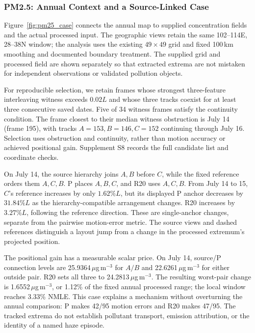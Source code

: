 \subsubsection{PM2.5: Annual Context and a Source-Linked Case}\label{sec:pm25_case}

Figure~\ref{fig:pm25_case} connects the annual map to supplied concentration fields and the actual processed input. The geographic views retain the same 102--114\textdegree E, 28--38\textdegree N window; the analysis uses the existing $49\times49$ grid and fixed 100\,km smoothing and documented boundary treatment. The supplied grid and processed field are shown separately so that extracted extrema are not mistaken for independent observations or validated pollution objects.

For reproducible selection, we retain frames whose strongest three-feature interleaving witness exceeds $0.02L$ and whose three tracks coexist for at least three consecutive saved dates. Five of 34 witness frames satisfy the continuity condition. The frame closest to their median witness obstruction is July 14 (frame 195), with tracks $A=153,B=146,C=152$ continuing through July 16. Selection uses obstruction and continuity, rather than motion accuracy or achieved positional gain. Supplement S8 records the full candidate list and coordinate checks.

On July 14, the source hierarchy joins $A,B$ before $C$, while the fixed reference orders them $A,C,B$. P places $A,B,C$, and R20 uses $A,C,B$. From July 14 to 15, $C$'s reference increases by only $1.62\%L$, but its displayed P anchor decreases by $31.84\%L$ as the hierarchy-compatible arrangement changes. R20 increases by $3.27\%L$, following the reference direction. These are single-anchor changes, separate from the pairwise motion-error metric. The source views and dashed references distinguish a layout jump from a change in the processed extremum's projected position.

The positional gain has a measurable scalar price. On July 14, source/P connection levels are 25.9364\,$\mu$g\,m$^{-3}$ for $A/B$ and 22.6261\,$\mu$g\,m$^{-3}$ for either outside pair. R20 sets all three to 24.2813\,$\mu$g\,m$^{-3}$. The resulting worst-pair change is 1.6552\,$\mu$g\,m$^{-3}$, or 1.12\% of the fixed annual processed range; the local window reaches 3.33\% NMLE. This case explains a mechanism without overturning the annual comparison: P makes 42/95 motion errors and R20 makes 47/95. The tracked extrema do not establish pollutant transport, emission attribution, or the identity of a named haze episode.
